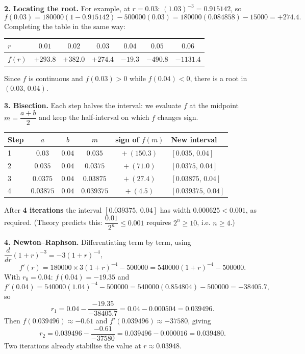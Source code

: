 \documentclass[11pt]{article}
\begin{document}
\textbf{2. Locating the root.} For example, at $r=0.03$: $(1.03)^{-3}=0.915142$, so
\[
f(0.03)=180000(1-0.915142)-500000(0.03)=180000(0.084858)-15000=+274.4.
\]
Completing the table in the same way:

\begin{center}
\begin{tabular}{|l|*{6}{c|}}
\hline
\rowcolor{popblueL} $r$ & $0.01$ & $0.02$ & $0.03$ & $0.04$ & $0.05$ & $0.06$ \\
\hline $f(r)$ & $+293.8$ & $+382.0$ & $+274.4$ & $-19.3$ & $-490.8$ & $-1131.4$ \\
\hline
\end{tabular}
\end{center}

Since $f$ is continuous and $f(0.03)>0$ while $f(0.04)<0$, there is a root in $(0.03,\,0.04)$.

\textbf{3. Bisection.} Each step halves the interval: we evaluate $f$ at the midpoint $m=\dfrac{a+b}{2}$ and keep the half-interval on which $f$ changes sign.

\begin{center}
\begin{tabular}{|l|c|c|c|c|l|}
\hline
\rowcolor{popblueL} Step & $a$ & $b$ & $m$ & sign of $f(m)$ & New interval \\
\hline 1 & $0.03$ & $0.04$ & $0.035$ & $+\ (150.3)$ & $[0.035,\,0.04]$ \\
\hline 2 & $0.035$ & $0.04$ & $0.0375$ & $+\ (71.0)$ & $[0.0375,\,0.04]$ \\
\hline 3 & $0.0375$ & $0.04$ & $0.03875$ & $+\ (27.4)$ & $[0.03875,\,0.04]$ \\
\hline 4 & $0.03875$ & $0.04$ & $0.039375$ & $+\ (4.5)$ & $[0.039375,\,0.04]$ \\
\hline
\end{tabular}
\end{center}

After \textbf{4 iterations} the interval $[0.039375,\,0.04]$ has width $0.000625<0.001$, as required. (Theory predicts this: $\dfrac{0.01}{2^{n}}\le 0.001$ requires $2^{n}\ge 10$, i.e. $n\ge 4$.)

\textbf{4. Newton--Raphson.} Differentiating term by term, using $\dfrac{d}{dr}(1+r)^{-3}=-3(1+r)^{-4}$,
\[
f'(r)=180000\times 3(1+r)^{-4}-500000=540000(1+r)^{-4}-500000.
\]
With $r_0=0.04$: $f(0.04)=-19.35$ and
\[
f'(0.04)=540000(1.04)^{-4}-500000=540000(0.854804)-500000=-38405.7,
\]
so
\[
r_1=0.04-\frac{-19.35}{-38405.7}=0.04-0.000504=0.039496.
\]
Then $f(0.039496)\approx-0.61$ and $f'(0.039496)\approx-37580$, giving
\[
r_2=0.039496-\frac{-0.61}{-37580}=0.039496-0.000016=0.039480.
\]
Two iterations already stabilise the value at $r\approx 0.03948$.
\end{document}
